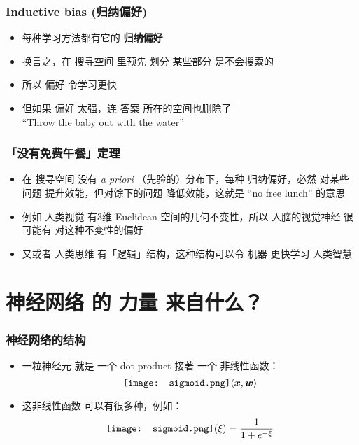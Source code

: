 \documentclass[17pt]{beamer}
\newcommand{\vect}[1]{\boldsymbol{#1}}
\newcommand*\sigmoid{\vcenter{\hbox{\texttt{[image: sigmoid.png]}}}}
\begin{document}
\begin{frame}
\frametitle{Inductive bias (归纳偏好)}
\begin{itemize}
	\item 每种学习方法都有它的 \textbf{归纳偏好}
	\item 换言之，在 搜寻空间 里预先 划分 某些部分 是不会搜索的
	\item 所以 偏好 令学习更快
	\item 但如果 偏好 太强，连 答案 所在的空间也删除了 \\
	``Throw the baby out with the water''
\end{itemize}
\end{frame}

\begin{frame}
\frametitle{「没有免费午餐」定理}
\begin{itemize}
	\item 在 搜寻空间 没有 \textit{a priori} （先验的）分布下，每种 归纳偏好，{\color{red}必然 对某些问题 提升效能，但对馀下的问题 降低效能}，这就是 ``no free lunch'' 的意思
	\item 例如 人类视觉 有3维 Euclidean 空间的几何不变性，所以 人脑的视觉神经 很可能有 对这种不变性的偏好
	\item 又或者 人类思维 有「逻辑」结构，这种结构可以令 机器 更快学习 人类智慧
\end{itemize}
\end{frame}


\section[Section]
{\texorpdfstring{神经网络 的 力量 \protect\linebreak[1] 来自什么？}
{神经网络 的 力量来自什么？}}
\frame{\sectionpage}

\begin{frame}
\frametitle{神经网络的结构}
\begin{itemize}
	\item 一粒神经元 就是 一个 dot product 接著 一个 非线性函数：
	\begin{equation}
	\sigmoid \langle \vect{x}, \vect{w} \rangle
	\end{equation}	
	\item 这非线性函数 可以有很多种，例如：
	\begin{equation}
	\sigmoid (\xi) = \frac{1}{1 + e^{- \xi}}
	\end{equation}
\end{itemize}
\end{frame}
\end{document}
